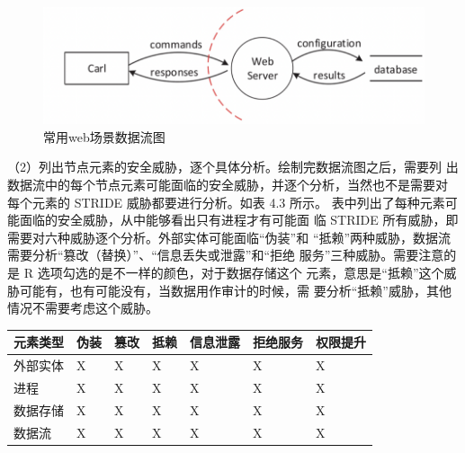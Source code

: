 \begin{figure}
    \centering
    \includegraphics[scale=0.6]{resources/img/i7.png}
    \caption{常用web场景数据流图}
  \end{figure}
  （2）列出节点元素的安全威胁，逐个具体分析。绘制完数据流图之后，需要列
  出数据流中的每个节点元素可能面临的安全威胁，并逐个分析，当然也不是需要对
  每个元素的 STRIDE 威胁都要进行分析。如表 4.3 所示。
  表中列出了每种元素可能面临的安全威胁，从中能够看出只有进程才有可能面
  临 STRIDE 所有威胁，即需要对六种威胁逐个分析。外部实体可能面临“伪装”和
  “抵赖”两种威胁，数据流需要分析“篡改（替换）”、“信息丢失或泄露”和“拒绝
  服务”三种威胁。需要注意的是 R 选项勾选的是不一样的颜色，对于数据存储这个
  元素，意思是“抵赖”这个威胁可能有，也有可能没有，当数据用作审计的时候，需
  要分析“抵赖”威胁，其他情况不需要考虑这个威胁。
  \begin{center}
    \begin{tabular}{|l|l|l|l|l|l|l}
      \hline 元素类型 & 伪装 & 篡改 & 抵赖 & 信息泄露 & 拒绝服务 & 权限提升\\
      \hline 外部实体 & X & X & X & X & X & X \\
      \hline 进程 & X & X & X & X & X & X \\
      \hline 数据存储 & X & X & X & X & X & X \\
      \hline 数据流 & X & X & X & X & X & X \\
      \hline
      \end{tabular}
  \end{center}
  
